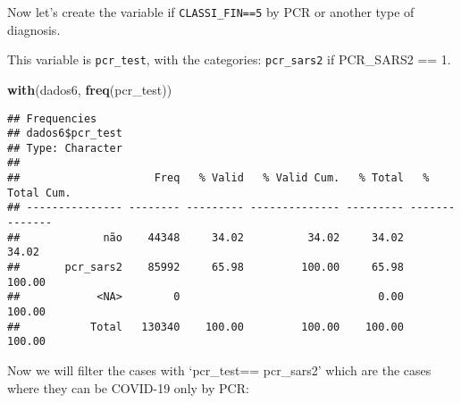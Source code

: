 \documentclass[
]{article}
\newenvironment{Shaded}{\begin{snugshade}}{\end{snugshade}}
\newcommand{\CommentTok}[1]{\textcolor[rgb]{0.56,0.35,0.01}{\textit{#1}}}
\newcommand{\DataTypeTok}[1]{\textcolor[rgb]{0.13,0.29,0.53}{#1}}
\newcommand{\DecValTok}[1]{\textcolor[rgb]{0.00,0.00,0.81}{#1}}
\newcommand{\KeywordTok}[1]{\textcolor[rgb]{0.13,0.29,0.53}{\textbf{#1}}}
\newcommand{\NormalTok}[1]{#1}
\newcommand{\OperatorTok}[1]{\textcolor[rgb]{0.81,0.36,0.00}{\textbf{#1}}}
\newcommand{\OtherTok}[1]{\textcolor[rgb]{0.56,0.35,0.01}{#1}}
\newcommand{\StringTok}[1]{\textcolor[rgb]{0.31,0.60,0.02}{#1}}
\begin{document}
Now let's create the variable if \texttt{CLASSI\_FIN==5} by PCR or
another type of diagnosis.

This variable is \texttt{pcr\_test}, with the categories:
\texttt{pcr\_sars2} if PCR\_SARS2 == 1.

\begin{Shaded}
\end{Shaded}

\begin{Shaded}
\begin{Highlighting}[]
\KeywordTok{with}\NormalTok{(dados6, }\KeywordTok{freq}\NormalTok{(pcr_test))}
\end{Highlighting}
\end{Shaded}

\begin{verbatim}
## Frequencies  
## dados6$pcr_test  
## Type: Character  
## 
##                     Freq   % Valid   % Valid Cum.   % Total   % Total Cum.
## --------------- -------- --------- -------------- --------- --------------
##             não    44348     34.02          34.02     34.02          34.02
##       pcr_sars2    85992     65.98         100.00     65.98         100.00
##            <NA>        0                               0.00         100.00
##           Total   130340    100.00         100.00    100.00         100.00
\end{verbatim}

Now we will filter the cases with `pcr\_test== pcr\_sars2' which are the
cases where they can be COVID-19 only by PCR:

\begin{Shaded}
\end{Shaded}
\end{document}
